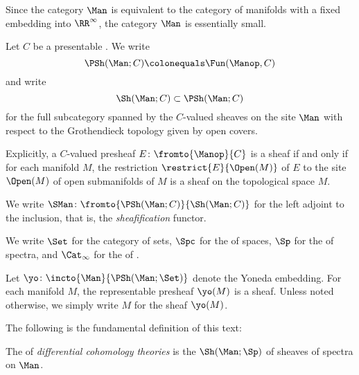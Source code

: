 \begin{remark}
	Since the category $ \Man $ is equivalent to the category of manifolds with a fixed embedding into $ \RR^\infty $, the category $ \Man $ is essentially small.
\end{remark}

\begin{definition}\label{def:sheafonMan}
	Let $ C $ be a presentable \category.
	We write 
	\begin{equation*}
		\PSh(\Man;C) \colonequals \Fun(\Manop,C)
	\end{equation*}
	and write
	\begin{equation*}
		\Sh(\Man;C) \subset \PSh(\Man;C)
	\end{equation*}
	for the full subcategory spanned by the $ C $-valued sheaves on the site $ \Man $ with respect to the Grothendieck topology given by open covers.

	Explicitly, a $ C $-valued presheaf $ E \colon \fromto{\Manop}{C} $ is a sheaf if and only if for each manifold $ M $, the restriction $ \restrict{E}{\Open(M)} $ of $ E $ to the site $ \Open(M) $ of open submanifolds of $ M $ is a sheaf on the topological space $ M $.
\end{definition}

\begin{notation}
	We write $ \SMan \colon \fromto{\PSh(\Man;C)}{\Sh(\Man;C)} $ for the left adjoint to the inclusion, that is, the \textit{sheafification} functor.
\end{notation}

\begin{notation}
	We write $ \Set $ for the category of sets, $ \Spc $ for the \category of spaces, $ \Sp $ for the \category of spectra, and $ \Cat_{\infty} $ for the \category of \categories.
\end{notation}

\begin{example}
	Let $ \yo \colon \incto{\Man}{\PSh(\Man;\Set)} $ denote the Yoneda embedding.
	For each manifold $ M $, the representable presheaf $ \yo(M) $ is a sheaf.
	Unless noted otherwise, we simply write $ M $ for the sheaf $ \yo(M) $.
\end{example}

The following is the fundamental definition of this text:

\begin{definition}\label{def:diffcoh}
	The \category of \textit{differential cohomology theories} is the \category $ \Sh(\Man;\Sp) $ of sheaves of spectra on $ \Man $. 
\end{definition}

